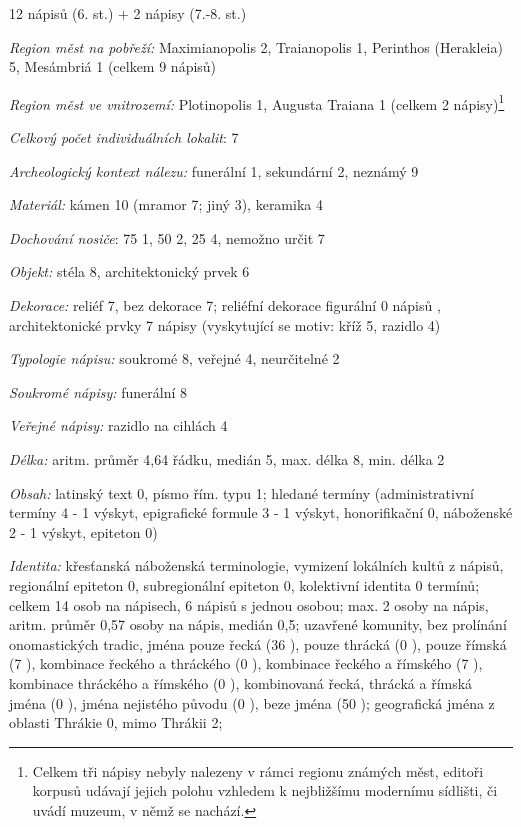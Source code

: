 \placetable[none]{}
\starttable[|l|]
\HL
{} 12 nápisů (6. st.) + 2 nápisy (7.-8. st.)

{\em Region měst na pobřeží:} Maximianopolis 2, Traianopolis 1, Perinthos (Herakleia) 5, Mesámbriá 1 (celkem 9 nápisů)

{\em Region měst ve vnitrozemí:} Plotinopolis 1, Augusta Traiana 1 (celkem 2 nápisy)\footnote{Celkem tři nápisy nebyly nalezeny v rámci regionu známých měst, editoři korpusů udávají jejich polohu vzhledem k nejbližšímu modernímu sídlišti, či uvádí muzeum, v němž se nachází.}

{\em Celkový počet individuálních lokalit}: 7

{\em Archeologický kontext nálezu:} funerální 1, sekundární 2, neznámý 9

{\em Materiál:} kámen 10 (mramor 7; jiný 3), keramika 4

{\em Dochování nosiče}: 75  1, 50  2, 25  4, nemožno určit 7

{\em Objekt:} stéla 8, architektonický prvek 6

{\em Dekorace:} reliéf 7, bez dekorace 7; reliéfní dekorace figurální 0 nápisů , architektonické prvky 7 nápisy (vyskytující se motiv: kříž 5, razidlo 4)

{\em Typologie nápisu:} soukromé 8, veřejné 4, neurčitelné 2

{\em Soukromé nápisy:} funerální 8

{\em Veřejné nápisy:} razidlo na cihlách 4

{\em Délka:} aritm. průměr 4,64 řádku, medián 5, max. délka 8, min. délka 2

{\em Obsah:} latinský text 0, písmo řím. typu 1; hledané termíny (administrativní termíny 4 - 1 výskyt, epigrafické formule 3 - 1 výskyt, honorifikační 0, náboženské 2 - 1 výskyt, epiteton 0)

{\em Identita:} křesťanská náboženská terminologie, vymizení lokálních kultů z nápisů, regionální epiteton 0, subregionální epiteton 0, kolektivní identita 0 termínů; celkem 14 osob na nápisech, 6 nápisů s jednou osobou; max. 2 osoby na nápis, aritm. průměr 0,57 osoby na nápis, medián 0,5; uzavřené komunity, bez prolínání onomastických tradic, jména pouze řecká (36 ), pouze thrácká (0 ), pouze římská (7 ), kombinace řeckého a thráckého (0 ), kombinace řeckého a římského (7 ), kombinace thráckého a římského (0 ), kombinovaná řecká, thrácká a římská jména (0 ), jména nejistého původu (0 ), beze jména (50 ); geografická jména z oblasti Thrákie 0, mimo Thrákii 2;

